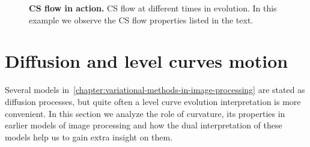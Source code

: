 \begin{figure}
\hspace{1em}
\caption{\textbf{CS flow in action.} CS flow at different times in evolution. In this example we observe the CS flow properties listed in the text.}
\end{figure}



\section{Diffusion and level curves motion}
\label{ch4:sec:diffusion-level-curves-motion}

Several models in~\cref{chapter:variational-methods-in-image-processing} are stated as diffusion processes, but quite often a level curve evolution interpretation is more convenient. In this section we analyze the role of curvature, its properties in earlier models of image processing and how the dual interpretation of these models help us to gain extra insight on them.

